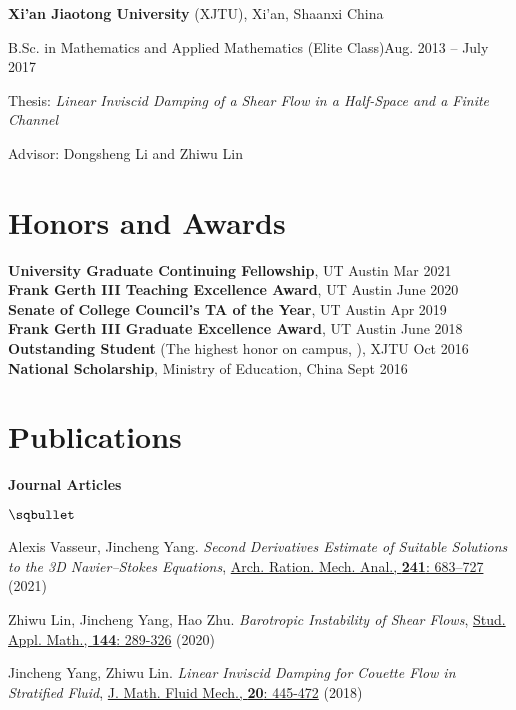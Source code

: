 \documentclass[margin,line]{res}
\newenvironment{list1}{
  \begin{list}{}{%
      \setlength{\itemsep}{0.02in}
      \setlength{\parsep}{0in} 
      \setlength{\parskip}{0in}
      \setlength{\topsep}{0.1in}
      \setlength{\partopsep}{-0.07in} 
      \setlength{\leftmargin}{0.15in}
    }}
{\end{list}}
\newenvironment{list2}{
  \begin{list}{$\sqbullet$}{%
      \setlength{\itemsep}{0.05in}
      \setlength{\parsep}{0in} 
      \setlength{\parskip}{0in}
      \setlength{\topsep}{0.1in} 
      \setlength{\partopsep}{-0.07in} 
      \setlength{\leftmargin}{0.15in}
    }}
{\end{list}}
\begin{document}
\begin{resume}
{\bf Xi'an Jiaotong University} (XJTU), Xi'an, Shaanxi China
\begin{list1}
\item B.Sc. in Mathematics and Applied Mathematics (Elite Class)\hfill Aug. 2013 -- July 2017
\item Thesis: \textit{Linear Inviscid Damping of a Shear Flow in a Half-Space and a Finite Channel}
\item Advisor: Dongsheng Li and Zhiwu Lin
\end{list1}

\section{\sc Honors and Awards} 
{\bf University Graduate Continuing Fellowship}, 
UT Austin \hfill {Mar 2021}\\
{\bf Frank Gerth III Teaching Excellence Award}, 
UT Austin \hfill {June 2020}\\
{\bf Senate of College Council's TA of the Year}, 
UT Austin \hfill {Apr 2019}\\
{\bf Frank Gerth III Graduate Excellence Award}, 
UT Austin \hfill {June 2018}\\
{\bf Outstanding Student} 
(The highest honor on campus, ),
XJTU \hfill {Oct 2016}\\
{\bf National Scholarship},
Ministry of Education, China \hfill {Sept 2016}

\section{\sc Publications}

{\bf Journal Articles}

\begin{list2}
    
    \item Alexis Vasseur, Jincheng Yang. \textit{Second Derivatives Estimate of Suitable Solutions to the 3D Navier--Stokes Equations},  \href{https://doi.org/10.1007/s00205-021-01661-4}{Arch. Ration. Mech. Anal., \textbf{241}: 683–727} (2021)

    \item Zhiwu Lin, Jincheng Yang, Hao Zhu. \textit{Barotropic Instability of Shear Flows}, 
    \href{https://doi.org/10.1111/sapm.12297}{Stud. Appl. Math., \textbf{144}: 289-326} (2020)
    
    \item Jincheng Yang, Zhiwu Lin. \textit{Linear Inviscid Damping for Couette Flow in Stratified Fluid}, \href{https://doi.org/10.1007/s00021-017-0328-3}{J. Math. Fluid Mech., \textbf{20}: 445-472} (2018)


\end{list2}
\end{resume}
\end{document}
